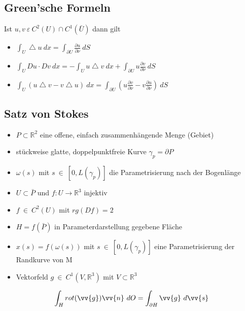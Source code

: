 \subsection{Green'sche Formeln}
Ist $u,v \ \varepsilon \ C^2(U)\cap C^1(\bar{U})$ dann gilt\\
\begin{itemize}
    \item $\int_U \bigtriangleup u \ dx = \int_{\partial U} \frac{\partial u}{\partial \nu} \ dS$
    \item $\int_U Du\cdot Dv \ dx = -\int_U u\bigtriangleup v \ dx + \int_{\partial U} u\frac{\partial v}{\partial \nu} \ dS$
    \item $\int_U (u\bigtriangleup v - v\bigtriangleup u) \ dx = \int_{\partial U} (u\frac{\partial v}{\partial \nu} - v\frac{\partial u}{\partial \nu}) \ dS$
\end{itemize}

\subsection{Satz von Stokes}
\begin{itemize}
    \item $P \subset \mathbb{R}^2$ eine offene, einfach zusammenhängende Menge (Gebiet)
    \item stückweise glatte, doppelpunktfreie Kurve $\gamma_p = \partial P$
    \item $\omega(s)$ mit $s \ \in \ [0,L(\gamma_p)]$ die Parametrisierung nach der Bogenlänge 
    \item $U \subset \bar{P}$ und $f: U \to \mathbb{R}^3$ injektiv
    \item $f \ \in \ C^2(U)$ mit $rg(Df)=2$
    \item $H = f(\bar{P})$ in Parameterdarstellung gegebene Fläche
    \item $x(s) = f(\omega(s))$ mit $s \ \in \ [0,L(\gamma_p)]$ eine Parametrisierung der Randkurve von M
    \item Vektorfeld $g \ \in \ C^1(V,\mathbb{R}^3)$ mit $V \subset \mathbb{R}^3$
\end{itemize}
\begin{equation}
    \int_H rot(\vv{g})\vv{n} \ dO = \int_{\partial H} \vv{g} \ d\vv{s}
\end{equation}

